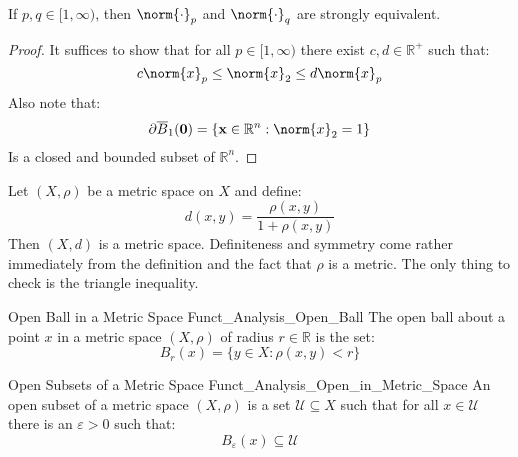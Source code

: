             \begin{theorem}
                If $p,q\in[1,\infty)$, then $\norm{\cdot}_{p}$ and
                $\norm{\cdot}_{q}$ are strongly equivalent.
            \end{theorem}
            \begin{proof}
                It suffices to show that for all
                $p\in[1,\infty)$ there exist
                $c,d\in\mathbb{R}^{+}$ such that:
                \begin{equation}
                    c\norm{x}_{p}\leq\norm{x}_{2}\leq{d}\norm{x}_{p}
                \end{equation}
                Also note that:
                \begin{equation}
                    \partial{\overline{B}_{1}(\mathbf{0})}=
                    \{\mathbf{x}\in\mathbb{R}^{n}:\norm{x}_{2}=1\}
                \end{equation}
                Is a closed and bounded subset of $\mathbb{R}^{n}$.
            \end{proof}
            \begin{lexample}
                Let $(X,\rho)$ be a metric space on $X$ and define:
                \begin{equation}
                    d(x,y)=\frac{\rho(x,y)}{1+\rho(x,y)}
                \end{equation}
                Then $(X,d)$ is a metric space. Definiteness
                and symmetry come rather immediately from the
                definition and the fact that $\rho$ is a metric.
                The only thing to check is the
                triangle inequality.
            \end{lexample}
            \begin{ldefinition}{Open Ball in a Metric Space}
                  {Funct_Analysis_Open_Ball}
                The open ball about a point $x$ in a metric space
                $(X,\rho)$ of radius $r\in\mathbb{R}$ is the set:
                \begin{equation}
                    B_{r}(x)=\{y\in{X}:\rho(x,y)<r\}
                \end{equation}
            \end{ldefinition}
            \begin{ldefinition}{Open Subsets of a Metric Space}
                  {Funct_Analysis_Open_in_Metric_Space}
                An open subset of a metric space $(X,\rho)$ is a set
                $\mathcal{U}\subseteq{X}$ such that for all
                $x\in\mathcal{U}$ there is an $\varepsilon>0$
                such that:
                \begin{equation}
                    B_{\varepsilon}(x)\subseteq\mathcal{U}
                \end{equation}
            \end{ldefinition}
